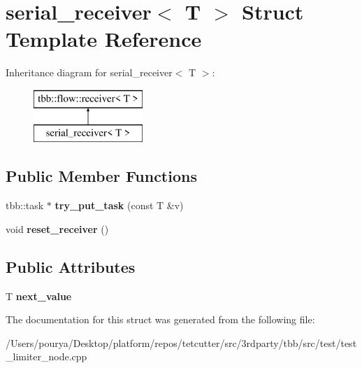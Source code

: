 \hypertarget{structserial__receiver}{}\section{serial\+\_\+receiver$<$ T $>$ Struct Template Reference}
\label{structserial__receiver}
Inheritance diagram for serial\+\_\+receiver$<$ T $>$\+:\begin{figure}[H]
\begin{center}
\leavevmode
\includegraphics[height=2.000000cm]{structserial__receiver}
\end{center}
\end{figure}
\subsection*{Public Member Functions}
\begin{DoxyCompactItemize}
\item 
\hypertarget{structserial__receiver_a7d9ac3a0663ccc41e5105061d3e58543}{}tbb\+::task $\ast$ {\bfseries try\+\_\+put\+\_\+task} (const T \&v)\label{structserial__receiver_a7d9ac3a0663ccc41e5105061d3e58543}

\item 
\hypertarget{structserial__receiver_a12bbe076aff192cfdf0b1d6e53ae9dfe}{}void {\bfseries reset\+\_\+receiver} ()\label{structserial__receiver_a12bbe076aff192cfdf0b1d6e53ae9dfe}

\end{DoxyCompactItemize}
\subsection*{Public Attributes}
\begin{DoxyCompactItemize}
\item 
\hypertarget{structserial__receiver_ab5bea7ab72f21d63c291bf7eaa286a95}{}T {\bfseries next\+\_\+value}\label{structserial__receiver_ab5bea7ab72f21d63c291bf7eaa286a95}

\end{DoxyCompactItemize}


The documentation for this struct was generated from the following file\+:\begin{DoxyCompactItemize}
\item 
/\+Users/pourya/\+Desktop/platform/repos/tetcutter/src/3rdparty/tbb/src/test/test\+\_\+limiter\+\_\+node.\+cpp\end{DoxyCompactItemize}
